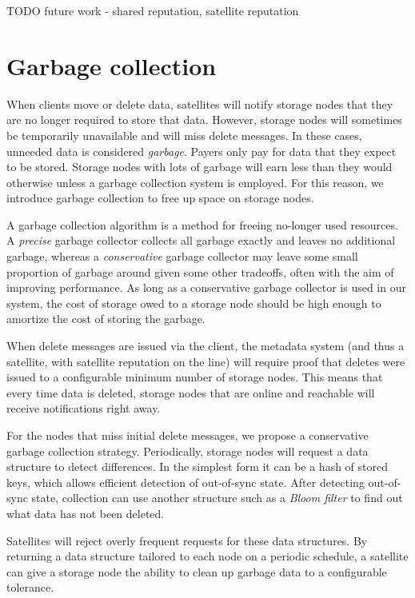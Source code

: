 \documentclass[11pt,fleqn,openany]{book}
\newcommand{\todo}[1]{{\color{red} TODO #1 }}
\begin{document}
\todo{future work - shared reputation, satellite reputation}

\section{Garbage collection}

When clients move or delete data, satellites will notify storage nodes
that they are no longer required to store that data. However,
storage nodes will sometimes be temporarily unavailable and will miss delete
messages. In these cases, unneeded data is considered
{\em garbage}. Payers only pay for data that they expect to be stored. Storage
nodes with lots of garbage will earn less than they would
otherwise unless a garbage collection system is employed. For this reason, we
introduce garbage collection to free up space on storage nodes.

A garbage collection algorithm is a method for freeing no-longer used resources.
A {\em precise} garbage collector collects all garbage exactly and
leaves no additional garbage, whereas a {\em conservative} garbage collector may
leave some small proportion of garbage around given some other tradeoffs,
often with the aim of improving performance.
As long as a conservative garbage collector is used in our system, the cost of
storage owed to a storage node should be high enough to amortize the cost of
storing the garbage.

When delete messages are issued via the client, the metadata system (and thus a
satellite, with satellite reputation on the line) will require proof that
deletes were issued to a configurable minimum number of storage nodes.
This means that every time
data is deleted, storage nodes that are online and reachable will receive
notifications right away.

For the nodes that miss initial delete messages, we propose a conservative
garbage collection strategy. Periodically, storage nodes will request
a data structure to detect differences. In the simplest form it can be a hash
of stored keys, which allows efficient detection of out-of-sync state. After
detecting out-of-sync state, collection can use another structure such as a
{\em Bloom filter} \cite{bloom-filter} to find out what data has not been
deleted.

Satellites will reject overly frequent requests for these data structures.
By returning a data
structure tailored to each node on a periodic schedule, a satellite can give a
storage node the ability to clean up garbage data to a configurable tolerance.
\end{document}
